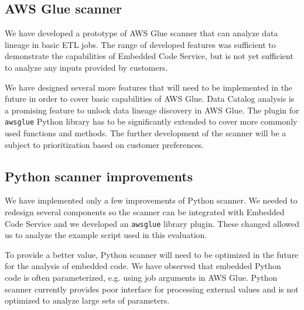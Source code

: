 \subsection{AWS Glue scanner}
We have developed a prototype of AWS Glue scanner that can analyze data lineage in basic ETL jobs. The range of developed features was sufficient to demonstrate the capabilities of Embedded Code Service, but is not yet sufficient to analyze any inputs provided by customers. 
\par
We have designed several more features that will need to be implemented in the future in order to cover basic capabilities of AWS Glue. Data Catalog analysis is a promising feature to unlock data lineage discovery in AWS Glue. The plugin for \texttt{awsglue} Python library has to be significantly extended to cover more commonly used functions and methods. The further development of the scanner will be a subject to prioritization based on customer preferences.

\subsection{Python scanner improvements}
We have implemented only a few improvements of Python scanner. We needed to redesign several components so the scanner can be integrated with Embedded Code Service and we developed an \texttt{awsglue} library plugin. These changed allowed us to analyze the example script used in this evaluation.
\par
To provide a better value, Python scanner will need to be optimized in the future for the analysis of embedded code. We have observed that embedded Python code is often parameterized, e.g. using job arguments in AWS Glue. Python scanner currently provides poor interface for processing external values and is not optimized to analyze large sets of parameters.


